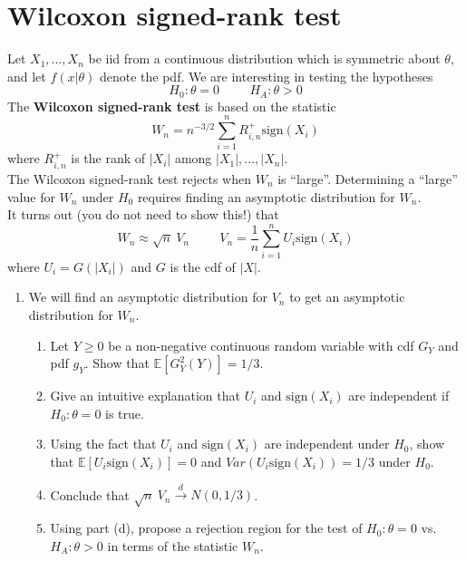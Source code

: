 \documentclass[11pt]{article}
\begin{document}
\section*{Wilcoxon signed-rank test}

Let $X_1,...,X_n$ be iid from a continuous distribution which is symmetric about $\theta$, and let $f(x|\theta)$ denote the pdf. We are interesting in testing the hypotheses
$$H_0: \theta = 0 \hspace{1cm} H_A: \theta > 0$$
The \textbf{Wilcoxon signed-rank test} is based on the statistic
$$W_n = n^{-3/2} \sum \limits_{i=1}^n R_{i,n}^+ \text{sign}(X_i)$$
where $R_{i,n}^+$ is the rank of $|X_i|$ among $|X_1|,...,|X_n|$.\\

\noindent The Wilcoxon signed-rank test rejects when $W_n$ is ``large''. Determining a ``large'' value for $W_n$ under $H_0$ requires finding an asymptotic distribution for $W_n$.\\

\noindent It turns out (you do not need to show this!) that
$$W_n \approx \sqrt{n} \ V_n \hspace{1cm} V_n = \frac{1}{n} \sum \limits_{i=1}^n U_i \text{sign}(X_i)$$
where $U_i = G(|X_i|)$ and $G$ is the cdf of $|X|$. 

\begin{enumerate}
\item[12.] We will find an asymptotic distribution for $V_n$ to get an asymptotic distribution for $W_n$.

\begin{enumerate}
\item Let $Y \geq 0$ be a non-negative continuous random variable with cdf $G_Y$ and pdf $g_Y$. Show that $\mathbb{E}[G_Y^2(Y)] = 1/3$.

\item Give an intuitive explanation that $U_i$ and $\text{sign}(X_i)$ are independent if $H_0: \theta = 0$ is true.

\item Using the fact that $U_i$ and $\text{sign}(X_i)$ are independent under $H_0$, show that $\mathbb{E}[U_i \text{sign}(X_i)] = 0$ and $Var(U_i \text{sign}(X_i)) = 1/3$ under $H_0$.

\item Conclude that $\sqrt{n} \ V_n \overset{d}{\to} N(0, 1/3)$.

\item Using part (d), propose a rejection region for the test of $H_0: \theta = 0$ vs. $H_A: \theta > 0$ in terms of the statistic $W_n$.
\end{enumerate}
\end{enumerate}
\end{document}
